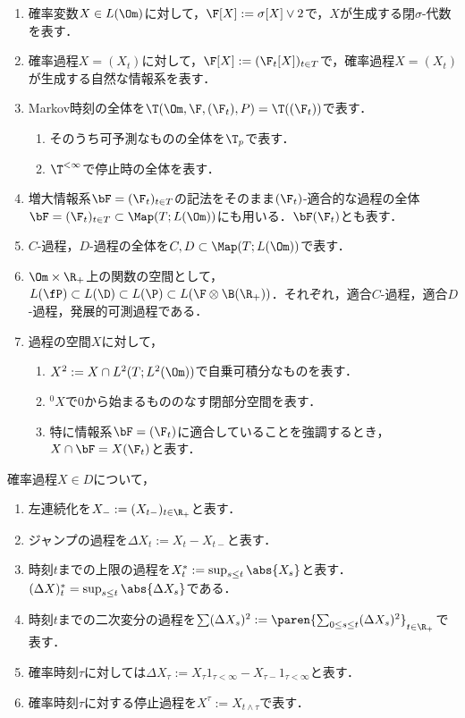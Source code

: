 \documentclass[uplatex,dvipdfmx]{jsreport}
\begin{document}
\begin{notation}[空間の名前に関する記法]\mbox{}
    \begin{enumerate}
        \item 確率変数$X\in L(\Om)$に対して，$\F[X]:=\sigma[X]\lor 2$で，$X$が生成する閉$\sigma$-代数を表す．
        \item 確率過程$X=(X_t)$に対して，$\F[X]:=(\F_t[X])_{t\in T}$で，確率過程$X=(X_t)$が生成する自然な情報系を表す．
        \item Markov時刻の全体を$\T(\Om,\F,(\F_t),P)=\T((\F_t))$で表す．
        \begin{enumerate}
            \item そのうち可予測なものの全体を$\T_p$で表す．
            \item $\T^{<\infty}$で停止時の全体を表す．
        \end{enumerate}
        \item 増大情報系$\bF=(\F_t)_{t\in T}$の記法をそのまま$(\F_t)$-適合的な過程の全体$\bF=(\F_t)_{t\in T}\subset\Map(T;L(\Om))$にも用いる．$\bF(\F_t)$とも表す．
        \item $C$-過程，$D$-過程の全体を$C,D\subset\Map(T;L(\Om))$で表す．
        \item $\Om\times\R_+$上の関数の空間として，$L(\fP)\subset L(\D)\subset L(\P)\subset L(\F\otimes\B(\R_+))$．それぞれ，適合$C$-過程，適合$D$-過程，発展的可測過程である．
        \item 過程の空間$X$に対して，
        \begin{enumerate}
            \item $X^2:=X\cap L^2(T;L^2(\Om))$で自乗可積分なものを表す．
            \item ${}^0\!X$で$0$から始まるもののなす閉部分空間を表す．
            \item 特に情報系$\bF=(\F_t)$に適合していることを強調するとき，$X\cap\bF=X(\F_t)$と表す．
        \end{enumerate}
    \end{enumerate}
\end{notation}

\begin{notation}[過程の構成に関する記法]
    確率過程$X\in D$について，
    \begin{enumerate}
        \item 左連続化を$X_-:=(X_{t-})_{t\in\R_+}$と表す．
        \item ジャンプの過程を$\Delta X_t:=X_t-X_{t-}$と表す．
        \item 時刻$t$までの上限の過程を$X^*_t:=\sup_{s\le t}\abs{X_s}$と表す．$(\Delta X)_t^*=\sup_{s\le t}\abs{\Delta X_s}$である．
        \item 時刻$t$までの二次変分の過程を$\sum(\Delta X_s)^2:=\paren{\sum_{0\le s\le t}(\Delta X_s)^2}_{t\in\R_+}$で表す．
        \item 確率時刻$\tau$に対しては$\Delta X_\tau:=X_\tau1_{\tau<\infty}-X_{\tau-}1_{\tau<\infty}$と表す．
        \item 確率時刻$\tau$に対する停止過程を$X^\tau:=X_{t\land\tau}$で表す．
    \end{enumerate}
\end{notation}
\end{document}
